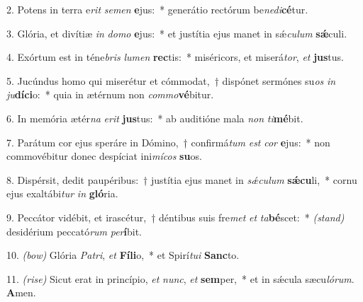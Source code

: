 2. Potens in terra e\textit{rit} \textit{se}\textit{men} \textbf{e}jus:~* generátio rectórum be\textit{ne}\textit{di}\textbf{cé}tur.

3. Glória, et divítiæ \textit{in} \textit{do}\textit{mo} \textbf{e}jus:~* et justítia ejus manet in sǽ\textit{cu}\textit{lum} \textbf{sǽ}culi.

4. Exórtum est in téne\textit{bris} \textit{lu}\textit{men} \textbf{rec}tis:~* miséricors, et miserá\textit{tor}, \textit{et} \textbf{jus}tus.

5. Jucúndus homo qui miserétur et cómmodat,~† dispónet sermónes su\textit{os} \textit{in} \textit{ju}\textbf{dí}\textbf{ci}o:~* quia in ætérnum non \textit{com}\textit{mo}\textbf{vé}bitur.

6. In memória ætér\textit{na} \textit{e}\textit{rit} \textbf{jus}tus:~* ab auditióne mala \textit{non} \textit{ti}\textbf{mé}bit.

7. Parátum cor ejus speráre in Dómino,~† confirmá\textit{tum} \textit{est} \textit{cor} \textbf{e}jus:~* non commovébitur donec despíciat ini\textit{mí}\textit{cos} \textbf{su}os.

8. Dispérsit, dedit paupéribus:~† justítia ejus manet in \textit{sǽ}\textit{cu}\textit{lum} \textbf{sǽ}\textbf{cu}li,~* cornu ejus exaltábi\textit{tur} \textit{in} \textbf{gló}ria.

9. Peccátor vidébit, et irascétur,~† déntibus suis fre\textit{met} \textit{et} \textit{ta}\textbf{bé}scet:~* {\color{red}\textit{(stand)}} desidérium peccató\textit{rum} \textit{per}\textbf{í}bit.

10. {\color{red}\textit{(bow)}} Glória \textit{Pa}\textit{tri}, \textit{et} \textbf{Fí}\textbf{li}o,~* et Spirí\textit{tu}\textit{i} \textbf{Sanc}to.

11. {\color{red}\textit{(rise)}} Sicut erat in princípio, \textit{et} \textit{nunc}, \textit{et} \textbf{sem}per,~* et in sǽcula sæcu\textit{ló}\textit{rum}. \textbf{A}men.